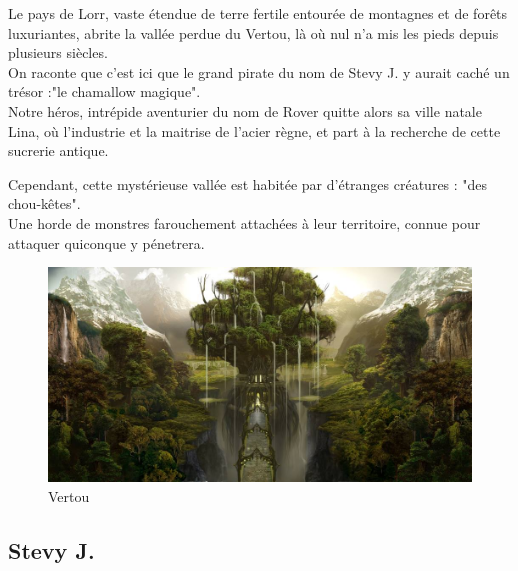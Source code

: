 \documentclass[a4paper 12pts]{article}
\begin{document}
\vspace{1cm}

Le pays de Lorr, vaste étendue de terre fertile entourée de montagnes et de forêts luxuriantes, abrite la vallée perdue du Vertou, 
là où nul n'a mis les pieds depuis plusieurs siècles.\\
On raconte que c'est ici que le grand pirate du nom de Stevy J. y aurait caché un trésor :"le chamallow magique".\\
Notre héros, intrépide aventurier du nom de Rover quitte alors sa ville natale Lina, où l'industrie et la maitrise de l'acier règne, et part à la recherche de cette sucrerie antique.\\

\newpage

Cependant, cette mystérieuse vallée est habitée par d'étranges créatures : "des chou-kêtes".\\
Une horde de monstres farouchement attachées à leur territoire, connue pour attaquer quiconque y pénetrera.\\

\vspace{1cm}

\begin{figure}[h]
	\includegraphics[width=350pt]{Illustration/vertou.jpg}
	\caption{Vertou}
\end{figure}



\vspace{1cm}


\newpage
\subsection{Stevy J.}

\vspace{1cm}
\end{document}
